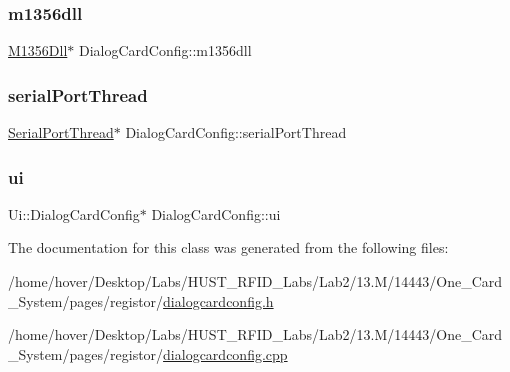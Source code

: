 \mbox{\label{class_dialog_card_config_a16e843ba7a55cbe43b35ee7459d8d464}} 
\subsubsection{\texorpdfstring{m1356dll}{m1356dll}}
{\footnotesize\ttfamily \mbox{\hyperlink{class_m1356_dll}{M1356\+Dll}}$\ast$ Dialog\+Card\+Config\+::m1356dll\hspace{0.3cm}{\ttfamily [private]}}

\mbox{\label{class_dialog_card_config_a03f0f53a1f6324827d54b5cc334994a2}} 
\subsubsection{\texorpdfstring{serialPortThread}{serialPortThread}}
{\footnotesize\ttfamily \mbox{\hyperlink{class_serial_port_thread}{Serial\+Port\+Thread}}$\ast$ Dialog\+Card\+Config\+::serial\+Port\+Thread\hspace{0.3cm}{\ttfamily [private]}}

\mbox{\label{class_dialog_card_config_a8eb08fb2f9189dc187da2d942d53838f}} 
\subsubsection{\texorpdfstring{ui}{ui}}
{\footnotesize\ttfamily Ui\+::\+Dialog\+Card\+Config$\ast$ Dialog\+Card\+Config\+::ui\hspace{0.3cm}{\ttfamily [private]}}



The documentation for this class was generated from the following files\+:\begin{DoxyCompactItemize}
\item 
/home/hover/\+Desktop/\+Labs/\+H\+U\+S\+T\+\_\+\+R\+F\+I\+D\+\_\+\+Labs/\+Lab2/13.\+M/14443/\+One\+\_\+\+Card\+\_\+\+System/pages/registor/\mbox{\hyperlink{dialogcardconfig_8h}{dialogcardconfig.\+h}}\item 
/home/hover/\+Desktop/\+Labs/\+H\+U\+S\+T\+\_\+\+R\+F\+I\+D\+\_\+\+Labs/\+Lab2/13.\+M/14443/\+One\+\_\+\+Card\+\_\+\+System/pages/registor/\mbox{\hyperlink{dialogcardconfig_8cpp}{dialogcardconfig.\+cpp}}\end{DoxyCompactItemize}
